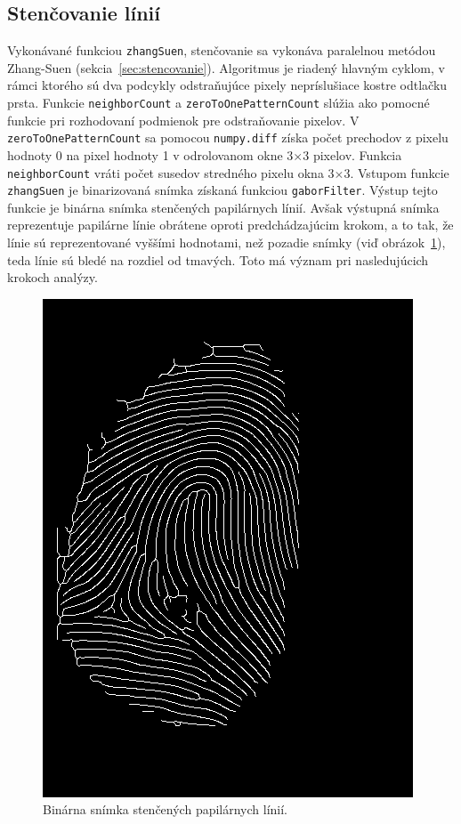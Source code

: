   \subsection{Stenčovanie línií}
  Vykonávané funkciou \texttt{zhangSuen}, stenčovanie sa vykonáva paralelnou metódou Zhang-Suen (sekcia~{\ref{sec:stencovanie}}). Algoritmus je riadený
  hlavným cyklom, v rámci ktorého sú
  dva podcykly odstraňujúce pixely nepríslušiace kostre odtlačku prsta. Funkcie \texttt{neighborCount} a \texttt{zeroToOnePatternCount} slúžia ako pomocné
  funkcie pri rozhodovaní podmienok pre odstraňovanie pixelov. V \texttt{zeroToOnePatternCount} sa pomocou \texttt{numpy.diff} získa počet prechodov
  z pixelu hodnoty 0 na pixel hodnoty 1 v odrolovanom okne $3$$\times{}$$3$ pixelov. Funkcia \texttt{neighborCount} vráti počet susedov stredného pixelu okna
  $3$$\times{}$$3$. Vstupom funkcie \texttt{zhangSuen} je binarizovaná snímka získaná funkciou \texttt{gaborFilter}.
  Výstup tejto funkcie je binárna snímka stenčených papilárnych línií. Avšak výstupná snímka reprezentuje papilárne línie obrátene oproti predchádzajúcim
  krokom, a to tak, že línie sú reprezentované vyššími hodnotami, než pozadie snímky (viď obrázok~{\ref{obr:stencene}}), teda línie sú bledé na rozdiel od
  tmavých. Toto má význam pri nasledujúcich krokoch analýzy.

  \begin{figure}[h]
    \centering
    \includegraphics[width=0.3\linewidth]{obrazky-figures/thinned.png}
    \caption{Binárna snímka stenčených papilárnych línií.}
    \label{obr:stencene}
  \end{figure}

